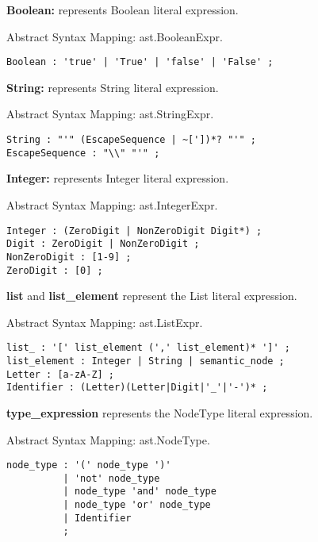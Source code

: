 \documentclass[parskip=full]{uvamscse}
\begin{document}
\begin{description}
\item\textbf{Boolean:} represents Boolean literal expression. 

Abstract Syntax Mapping: ast.BooleanExpr.

\begin{snippet}
\begin{verbatim}
Boolean : 'true' | 'True' | 'false' | 'False' ;
\end{verbatim}
\end{snippet}

\item\textbf{String:} represents String literal expression.

Abstract Syntax Mapping: ast.StringExpr.

\begin{snippet}
\begin{verbatim}
String : "'" (EscapeSequence | ~['])*? "'" ;
EscapeSequence : "\\" "'" ;
\end{verbatim}
\end{snippet}

\item\textbf{Integer:} represents Integer literal expression. 

Abstract Syntax Mapping: ast.IntegerExpr.

\begin{snippet}
\begin{verbatim}
Integer : (ZeroDigit | NonZeroDigit Digit*) ;
Digit : ZeroDigit | NonZeroDigit ;
NonZeroDigit : [1-9] ;
ZeroDigit : [0] ;
\end{verbatim}
\end{snippet}

\item\textbf{list} and \textbf{list\_element} represent the List literal expression. 

Abstract Syntax Mapping: ast.ListExpr.

\begin{snippet}
\begin{verbatim}
list_ : '[' list_element (',' list_element)* ']' ;
list_element : Integer | String | semantic_node ;
Letter : [a-zA-Z] ;
Identifier : (Letter)(Letter|Digit|'_'|'-')* ;
\end{verbatim}
\end{snippet}

\item\textbf{type\_expression} represents the NodeType literal expression.

Abstract Syntax Mapping: ast.NodeType.

\begin{snippet}
\begin{verbatim}
node_type : '(' node_type ')'
          | 'not' node_type
          | node_type 'and' node_type
          | node_type 'or' node_type
          | Identifier
          ;
\end{verbatim}
\end{snippet}

\end{description}
\end{document}
